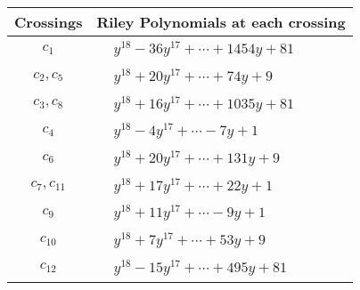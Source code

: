\documentclass[1p]{elsarticle_modified}
\theoremstyle{definition}
\begin{document}
\begin{tabular}{m{50pt}|m{274pt}}
Crossings & \hspace{64pt}Riley Polynomials at each crossing \\
\hline $$\begin{aligned}c_{1}\end{aligned}$$&$\begin{aligned}
&y^{18}-36 y^{17}+\cdots+1454 y+81
\end{aligned}$\\
\hline $$\begin{aligned}c_{2},c_{5}\end{aligned}$$&$\begin{aligned}
&y^{18}+20 y^{17}+\cdots+74 y+9
\end{aligned}$\\
\hline $$\begin{aligned}c_{3},c_{8}\end{aligned}$$&$\begin{aligned}
&y^{18}+16 y^{17}+\cdots+1035 y+81
\end{aligned}$\\
\hline $$\begin{aligned}c_{4}\end{aligned}$$&$\begin{aligned}
&y^{18}-4 y^{17}+\cdots-7 y+1
\end{aligned}$\\
\hline $$\begin{aligned}c_{6}\end{aligned}$$&$\begin{aligned}
&y^{18}+20 y^{17}+\cdots+131 y+9
\end{aligned}$\\
\hline $$\begin{aligned}c_{7},c_{11}\end{aligned}$$&$\begin{aligned}
&y^{18}+17 y^{17}+\cdots+22 y+1
\end{aligned}$\\
\hline $$\begin{aligned}c_{9}\end{aligned}$$&$\begin{aligned}
&y^{18}+11 y^{17}+\cdots-9 y+1
\end{aligned}$\\
\hline $$\begin{aligned}c_{10}\end{aligned}$$&$\begin{aligned}
&y^{18}+7 y^{17}+\cdots+53 y+9
\end{aligned}$\\
\hline $$\begin{aligned}c_{12}\end{aligned}$$&$\begin{aligned}
&y^{18}-15 y^{17}+\cdots+495 y+81
\end{aligned}$\\
\hline
\end{tabular}\\~\\
\end{document}

